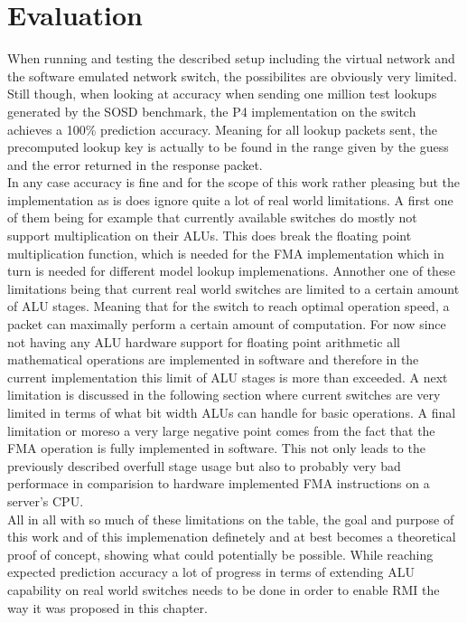 \section{Evaluation}
\label{sect:rmionbmv2:evaluation}
When running and testing the described setup including the virtual network and the software emulated network switch, the possibilites are obviously very limited. Still though, when looking at accuracy when sending one million test lookups generated by the SOSD benchmark, the P4 implementation on the switch achieves a 100\% prediction accuracy. Meaning for all lookup packets sent, the precomputed lookup key is actually to be found in the range given by the guess and the error returned in the response packet.\\

In any case accuracy is fine and for the scope of this work rather pleasing but the implementation as is does ignore quite a lot of real world limitations. A first one of them being for example that currently available switches do mostly not support multiplication on their ALUs. This does break the floating point multiplication function, which is needed for the FMA implementation which in turn is needed for different model lookup implemenations. Annother one of these limitations being that current real world switches are limited to a certain amount of ALU stages. Meaning that for the switch to reach optimal operation speed, a packet can maximally perform a certain amount of computation. For now since not having any ALU hardware support for floating point arithmetic all mathematical operations are implemented in software and therefore in the current implementation this limit of ALU stages is more than exceeded. A next limitation is discussed in the following section where current switches are very limited in terms of what bit width ALUs can handle for basic operations. A final limitation or moreso a very large negative point comes from the fact that the FMA operation is fully implemented in software. This not only leads to the previously described overfull stage usage but also to probably very bad performace in comparision to hardware implemented FMA instructions on a server's CPU.\\

All in all with so much of these limitations on the table, the goal and purpose of this work and of this implemenation definetely and at best becomes a theoretical proof of concept, showing what could potentially be possible. While reaching expected prediction accuracy a lot of progress in terms of extending ALU capability on real world switches needs to be done in order to enable RMI the way it was proposed in this chapter.


